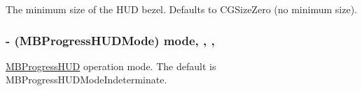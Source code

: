 The minimum size of the H\+U\+D bezel. Defaults to C\+G\+Size\+Zero (no minimum size). \hypertarget{interface_m_b_progress_h_u_d_ace77eaaf507e86fe56436f7ee7b6fdc9}{
\subsubsection[{mode}]{\setlength{\rightskip}{0pt plus 5cm}-\/ (M\+B\+Progress\+H\+U\+D\+Mode) mode\hspace{0.3cm}{\ttfamily [read]}, {\ttfamily [write]}, {\ttfamily [atomic]}, {\ttfamily [assign]}}}\label{interface_m_b_progress_h_u_d_ace77eaaf507e86fe56436f7ee7b6fdc9}
\hyperlink{interface_m_b_progress_h_u_d}{M\+B\+Progress\+H\+U\+D} operation mode. The default is M\+B\+Progress\+H\+U\+D\+Mode\+Indeterminate.

